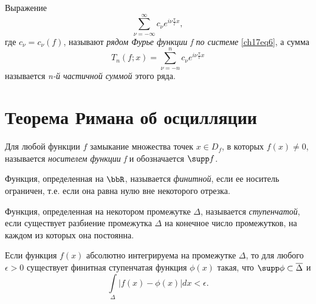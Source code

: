 \begin{defn}
Выражение
$$
\sum_{\nu = -\infty}^{\infty} c_{\nu}e^{i\nu\frac{\pi}{l}x},
$$
где $c_{\nu} = c_{\nu}(f)$, называют \textit{рядом Фурье функции f по системе} \eqref{ch17eq6}, а сумма
$$
T_{n}(f;x) = \sum_{\nu = -n}^{n} c_{\nu}e^{i\nu\frac{\pi}{l}x}
$$
называется \textit{n-й частичной суммой} этого ряда.
\end{defn}

\section{Теорема Римана об осцилляции}
\begin{defn}
Для любой функции $f$ замыкание множества точек $x \in D_{f}$, в которых $f(x) \neq 0$, называется \textit{носителем функции f} и обозначается $\supp f$.
\end{defn}
\begin{defn}
Функция, определенная на $\bbR$, называется \textit{финитной}, если ее носитель ограничен, т.е. если она равна нулю вне некоторого отрезка.
\end{defn}
\begin{defn}
Функция, определенная на некотором промежутке $\Delta$, называется \textit{ступенчатой}, если существует разбиение промежутка $\Delta$ на конечное число промежутков, на каждом из которых она постоянна.
\end{defn}
\begin{thm} \label{ch17thm1}
Если функция $f(x)$ абсолютно интегрируема на промежутке $\Delta$, то для любого $\epsilon > 0$ существует финитная ступенчатая функция $\phi(x)$ такая, что $\supp\phi \subset \overline{\Delta}$ и
\begin{equation} \label{ch17eq7}
\int\limits_{\Delta} |f(x) - \phi(x)|dx < \epsilon.
\end{equation}
\end{thm}

